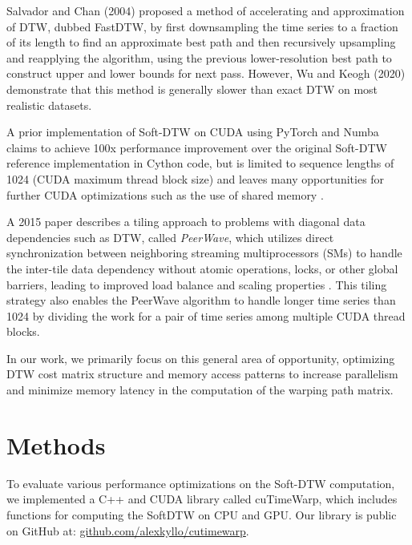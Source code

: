 \documentclass[12pt, letterpaper]{article}
\begin{document}
Salvador and Chan (2004) \cite{salvador_fastdtw_2004} proposed a method of
accelerating and approximation of DTW, dubbed FastDTW, by first downsampling the
time series to a fraction of its length to find an approximate best path and
then recursively upsampling and reapplying the algorithm, using the previous
lower-resolution best path to construct upper and lower bounds for next
pass. However, Wu and Keogh (2020) demonstrate that this method is generally
slower than exact DTW on most realistic datasets.

A prior implementation of Soft-DTW on CUDA using PyTorch and Numba claims to
achieve 100x performance improvement over the original Soft-DTW reference
implementation in Cython code, but is limited to sequence lengths of 1024 (CUDA
maximum thread block size) and leaves many opportunities for further CUDA
optimizations such as the use of shared memory
\cite{maghoumi_pytorch-softdtw-cuda_2021}.

A 2015 paper describes a tiling approach to problems with diagonal data
dependencies such as DTW, called \emph{PeerWave}, which utilizes direct
synchronization between neighboring streaming multiprocessors (SMs) to handle
the inter-tile data dependency without atomic operations, locks, or other global
barriers, leading to improved load balance and scaling properties
\cite{belviranli_peerwave_2015}. This tiling strategy also enables the PeerWave
algorithm to handle longer time series than 1024 by dividing the work for a pair
of time series among multiple CUDA thread blocks.

In our work, we primarily focus on this general area of opportunity, optimizing
DTW cost matrix structure and memory access patterns to increase parallelism and
minimize memory latency in the computation of the warping path matrix.

\section{Methods}

To evaluate various performance optimizations on the Soft-DTW computation, we
implemented a C++ and CUDA library called cuTimeWarp, which includes functions
for computing the SoftDTW on CPU and GPU. Our library is public on GitHub at:
\href{https://github.com/alexkyllo/cutimewarp}{github.com/alexkyllo/cutimewarp}.
\end{document}
